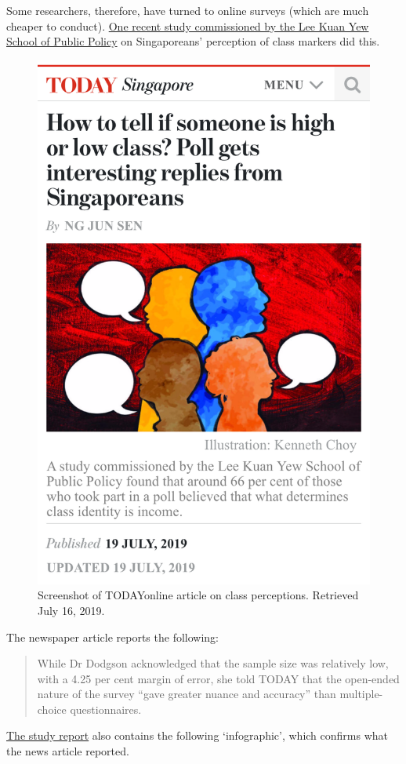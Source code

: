 \documentclass[
  openany]{book}
\begin{document}
Some researchers, therefore, have turned to online surveys (which are much cheaper to conduct). \href{https://lkyspp.nus.edu.sg/docs/default-source/gia-documents/cars_-condos-and-cai-png-survey-(high-res).pdf}{One recent study commissioned by the Lee Kuan Yew School of Public Policy} on Singaporeans' perception of class markers did this.

\begin{figure}

{\centering \includegraphics[width=0.5\linewidth]{images/samples/today_classpercept} 

}

\caption{Screenshot of TODAYonline article on class perceptions. Retrieved July 16, 2019.}\label{fig:today-classmarkers}
\end{figure}

The newspaper article reports the following:

\begin{quote}
While Dr Dodgson acknowledged that the sample size was relatively low, with a 4.25 per cent margin of error, she told TODAY that the open-ended nature of the survey ``gave greater nuance and accuracy'' than multiple-choice questionnaires.
\end{quote}

\href{https://lkyspp.nus.edu.sg/docs/default-source/gia-documents/cars_-condos-and-cai-png-survey-(high-res).pdf}{The study report} also contains the following `infographic', which confirms what the news article reported.
\end{document}
